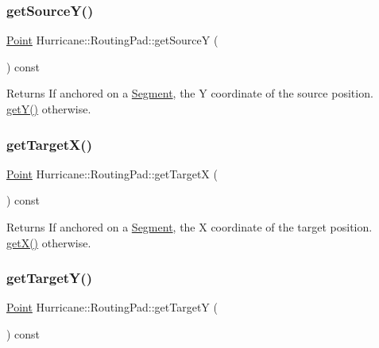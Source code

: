 \subsubsection{\texorpdfstring{get\+Source\+Y()}{getSourceY()}}
{\footnotesize\ttfamily \hyperlink{classHurricane_1_1Point}{Point} Hurricane\+::\+Routing\+Pad\+::get\+SourceY (\begin{DoxyParamCaption}{ }\end{DoxyParamCaption}) const}

\begin{DoxyReturn}{Returns}
If anchored on a \hyperlink{classHurricane_1_1Segment}{Segment}, the Y coordinate of the source position. \hyperlink{classHurricane_1_1RoutingPad_aede4c04a7f893b1e5478b164b6eaae2d}{get\+Y()} otherwise. 
\end{DoxyReturn}
\mbox{\label{classHurricane_1_1RoutingPad_a3c0f5056b20515d308c2945ab692bce5}} 
\subsubsection{\texorpdfstring{get\+Target\+X()}{getTargetX()}}
{\footnotesize\ttfamily \hyperlink{classHurricane_1_1Point}{Point} Hurricane\+::\+Routing\+Pad\+::get\+TargetX (\begin{DoxyParamCaption}{ }\end{DoxyParamCaption}) const}

\begin{DoxyReturn}{Returns}
If anchored on a \hyperlink{classHurricane_1_1Segment}{Segment}, the X coordinate of the target position. \hyperlink{classHurricane_1_1RoutingPad_a5c9c00c648bd0d24e1a8b0876ab442df}{get\+X()} otherwise. 
\end{DoxyReturn}
\mbox{\label{classHurricane_1_1RoutingPad_a41a9c831d668377fc0c5e628f66465a0}} 
\subsubsection{\texorpdfstring{get\+Target\+Y()}{getTargetY()}}
{\footnotesize\ttfamily \hyperlink{classHurricane_1_1Point}{Point} Hurricane\+::\+Routing\+Pad\+::get\+TargetY (\begin{DoxyParamCaption}{ }\end{DoxyParamCaption}) const}

